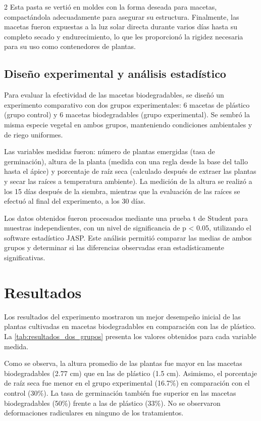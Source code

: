 \begin{multicols}{2}
Esta pasta se vertió en moldes con la forma deseada para macetas, compactándola adecuadamente para asegurar su estructura. Finalmente, las macetas fueron expuestas a la luz solar directa durante varios días hasta su completo secado y endurecimiento, lo que les proporcionó la rigidez necesaria para su uso como contenedores de plantas.

\subsection{Diseño experimental y análisis estadístico}

Para evaluar la efectividad de las macetas biodegradables, se diseñó un experimento comparativo con dos grupos experimentales: 6 macetas de plástico (grupo control) y 6 macetas biodegradables (grupo experimental). Se sembró la misma especie vegetal en ambos grupos, manteniendo condiciones ambientales y de riego uniformes.

Las variables medidas fueron: número de plantas emergidas (tasa de germinación), altura de la planta (medida con una regla desde la base del tallo hasta el ápice) y porcentaje de raíz seca (calculado después de extraer las plantas y secar las raíces a temperatura ambiente). La medición de la altura se realizó a los 15 días después de la siembra, mientras que la evaluación de las raíces se efectuó al final del experimento, a los 30 días.

Los datos obtenidos fueron procesados mediante una prueba t de Student para muestras independientes, con un nivel de significancia de p < 0.05, utilizando el software estadístico JASP. Este análisis permitió comparar las medias de ambos grupos y determinar si las diferencias observadas eran estadísticamente significativas.

\section{Resultados}

Los resultados del experimento mostraron un mejor desempeño inicial de las plantas cultivadas en macetas biodegradables en comparación con las de plástico. La \autoref{tab:resultados_dos_grupos} presenta los valores obtenidos para cada variable medida.



Como se observa, la altura promedio de las plantas fue mayor en las macetas biodegradables (2.77 cm) que en las de plástico (1.5 cm). Asimismo, el porcentaje de raíz seca fue menor en el grupo experimental (16.7\%) en comparación con el control (30\%). La tasa de germinación también fue superior en las macetas biodegradables (50\%) frente a las de plástico (33\%). No se observaron deformaciones radiculares en ninguno de los tratamientos.


\end{multicols}
